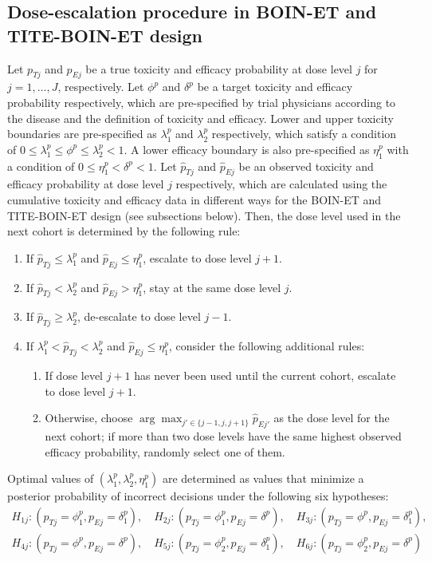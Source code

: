 \subsection{Dose-escalation procedure in BOIN-ET and TITE-BOIN-ET design}
Let $p_{Tj}$ and $p_{Ej}$ be a true toxicity and efficacy probability at dose level $j$ for $ j=1,\ldots,J$, respectively. Let $\phi^p$ and $\delta^p$ be a target toxicity and efficacy probability respectively, which are pre-specified by trial physicians according to the disease and the definition of toxicity and efficacy. Lower and upper toxicity boundaries are pre-specified as $\lambda^p_1$ and $\lambda^p_2$ respectively, which satisfy a condition of $0\leq\lambda^p_1\leq\phi^p\leq\lambda^p_2<1$. A lower efficacy boundary is also pre-specified as $\eta^p_1$ with a condition of $0\leq\eta^p_1<\delta^p<1$. Let $\hat{p}_{Tj}$ and $\hat{p}_{Ej}$ be an observed toxicity and efficacy probability at dose level $j$ respectively, which are calculated using the cumulative toxicity and efficacy data in different ways for the BOIN-ET and TITE-BOIN-ET design (see subsections below). Then, the dose level used in the next cohort is determined by the following rule:
\begin{enumerate}
\item If $\hat{p}_{Tj}\leq\lambda^p_1$ and $\hat{p}_{Ej}\leq\eta^p_1$, escalate to dose level $j+1$.
\item If $\hat{p}_{Tj}<\lambda^p_2$ and $\hat{p}_{Ej}>\eta^p_1$, stay at the same dose level $j$.
\item If $\hat{p}_{Tj}\geq\lambda^p_2$, de-escalate to dose level $j-1$.
\item If $\lambda^p_1<\hat{p}_{Tj}<\lambda^p_2$ and $\hat{p}_{Ej}\leq\eta^p_1$, consider the following additional rules:
  \begin{enumerate}
  \item If dose level $j+1$ has never been used until the current cohort, escalate to dose level $j+1$. 
  \item Otherwise, choose $\arg\max_{j'\in\{j-1,j,j+1\}}\hat{p}_{Ej'}$ as the dose level for the next cohort; if more than two dose levels have the same highest observed efficacy probability, randomly select one of them. 
  \end{enumerate}
\end{enumerate}
Optimal values of $(\lambda^p_1,\lambda^p_2,\eta^p_1)$ are determined as values that minimize a posterior probability of incorrect decisions under the following six hypotheses:
\begin{gather*}
H_{1j}: (p_{Tj}=\phi^p_1,p_{Ej}=\delta^p_1),\quad H_{2j}: (p_{Tj}=\phi^p_1,p_{Ej}=\delta^p),\quad H_{3j}: (p_{Tj}=\phi^p,p_{Ej}=\delta^p_1), \\
H_{4j}: (p_{Tj}=\phi^p,p_{Ej}=\delta^p),\quad H_{5j}: (p_{Tj}=\phi^p_2,p_{Ej}=\delta^p_1),\quad H_{6j}: (p_{Tj}=\phi^p_2,p_{Ej}=\delta^p)
\end{gather*}

